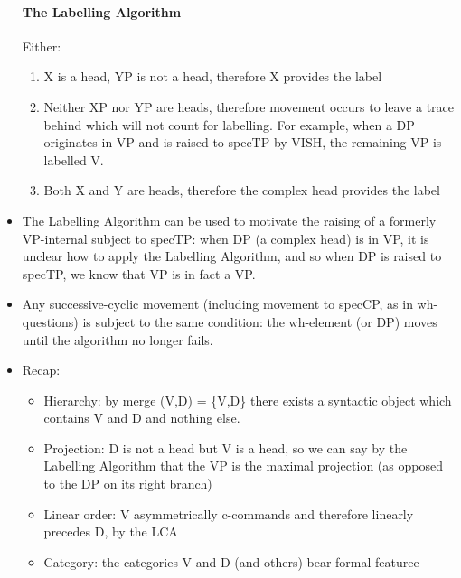 \documentclass{article}
\begin{document}
\begin{itemize}
    \paragraph{The Labelling Algorithm} Either:
    \begin{enumerate}
        \item X is a head, YP is not a head, therefore X provides the label
        \item Neither XP nor YP are heads, therefore movement occurs to leave a trace behind which will not count for labelling. For example, when a DP originates in VP and is raised to specTP by VISH, the remaining VP is labelled V.
        \item Both X and Y are heads, therefore the complex head provides the label 
    \end{enumerate}
    \item The Labelling Algorithm can be used to motivate the raising of a formerly VP-internal subject to specTP: when DP (a complex head) is in VP, it is unclear how to apply the Labelling Algorithm, and so when DP is raised to specTP, we know that VP is in fact a VP.
    \item Any successive-cyclic movement (including movement to specCP, as in wh-questions) is subject to the same condition: the wh-element (or DP) moves until the algorithm no longer fails.
    \item Recap:
    \begin{itemize}
        \item Hierarchy: by merge (V,D) = \{V,D\} there exists a syntactic object which contains V and D and nothing else.
        \item Projection: D is not a head but V is a head, so we can say by the Labelling Algorithm that the VP is the maximal projection (as opposed to the DP on its right branch)
        \item Linear order: V asymmetrically c-commands and therefore linearly precedes D, by the LCA
        \item Category: the categories V and D (and others) bear formal featuree
    \end{itemize}
\end{itemize}
\end{document}
